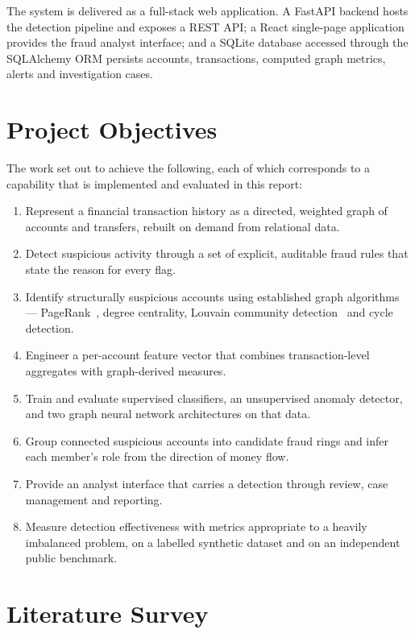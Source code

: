 The system is delivered as a full-stack web application. A FastAPI backend hosts the detection pipeline and exposes a REST API; a React single-page application provides the fraud analyst interface; and a SQLite database accessed through the SQLAlchemy ORM persists accounts, transactions, computed graph metrics, alerts and investigation cases.

\section{Project Objectives}
The work set out to achieve the following, each of which corresponds to a capability that is implemented and evaluated in this report:

\begin{enumerate}
  \item Represent a financial transaction history as a directed, weighted graph of accounts and transfers, rebuilt on demand from relational data.
  \item Detect suspicious activity through a set of explicit, auditable fraud rules that state the reason for every flag.
  \item Identify structurally suspicious accounts using established graph algorithms --- PageRank~\cite{page1999}, degree centrality, Louvain community detection~\cite{blondel2008} and cycle detection.
  \item Engineer a per-account feature vector that combines transaction-level aggregates with graph-derived measures.
  \item Train and evaluate supervised classifiers, an unsupervised anomaly detector, and two graph neural network architectures on that data.
  \item Group connected suspicious accounts into candidate fraud rings and infer each member's role from the direction of money flow.
  \item Provide an analyst interface that carries a detection through review, case management and reporting.
  \item Measure detection effectiveness with metrics appropriate to a heavily imbalanced problem, on a labelled synthetic dataset and on an independent public benchmark.
\end{enumerate}


\section{Literature Survey}

